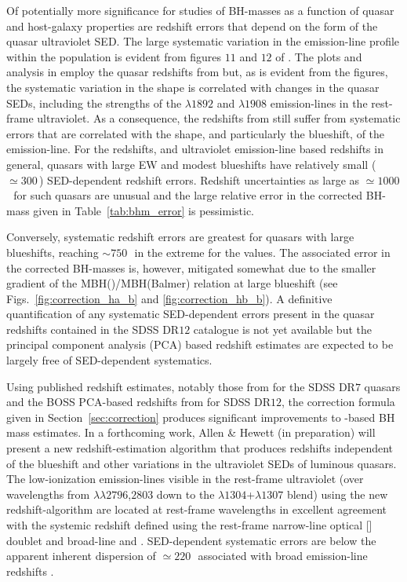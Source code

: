 Of potentially more significance for studies of BH-masses as a function of quasar and host-galaxy properties are redshift errors that depend on the form of the quasar ultraviolet SED.
The large systematic variation in the  emission-line profile within the population is evident from figures $11$ and $12$ of \citet{richards11}. 
The plots and analysis in \citet{richards11} employ the quasar redshifts from \citet{hewett10} but, as is evident from the figures, the systematic variation in the  shape is correlated with changes in the quasar SEDs, including the strengths of the $\lambda$$1892$ and $\lambda$$1908$ emission-lines in the rest-frame ultraviolet. 
As a consequence, the redshifts from \citet{hewett10} still suffer from systematic errors that are correlated with the shape, and particularly the blueshift, of the  emission-line.
For the \citet{hewett10} redshifts, and ultraviolet emission-line based redshifts in general, quasars with large  EW and modest blueshifts have relatively small ($\simeq300$\,\kms) SED-dependent redshift errors.
Redshift uncertainties as large as $\simeq1000$\,\kms\, for such quasars are unusual and the large relative error in the corrected  BH-mass given in Table~\ref{tab:bhm_error} is pessimistic. 

Conversely, systematic redshift errors are greatest for quasars with large blueshifts, reaching $\sim750$\,\kms\, in the extreme for the \citet{hewett10} values. 
The associated error in the corrected  BH-masses is, however, mitigated somewhat due to the smaller gradient of the MBH()/MBH(Balmer) relation at large  blueshift (see Figs.~\ref{fig:correction_ha_b} and \ref{fig:correction_hb_b}). 
A definitive quantification of any systematic SED-dependent errors present in the quasar redshifts contained in the SDSS DR$12$ catalogue is not yet available but the principal component analysis (PCA) based redshift estimates are expected to be largely free of SED-dependent systematics. 

Using published redshift estimates, notably those from \citet{hewett10} for the SDSS DR$7$ quasars and the BOSS PCA-based redshifts from \citet{paris17} for SDSS DR$12$, the correction formula given in Section~\ref{sec:correction} produces significant improvements to -based BH mass estimates.
In a forthcoming work, Allen \& Hewett (in preparation) will present a new redshift-estimation algorithm that produces redshifts independent of the  blueshift and other variations in the ultraviolet SEDs of luminous quasars.
The low-ionization emission-lines visible in the rest-frame ultraviolet (over wavelengths from $\lambda\lambda$$2796$,$2803$ down to the $\lambda$$1304$+$\lambda$$1307$ blend) using the new redshift-algorithm are located at rest-frame wavelengths in excellent agreement with the systemic redshift defined using the rest-frame narrow-line optical [] doublet and broad-line \hb and \hans.
SED-dependent systematic errors are below the apparent inherent dispersion of $\simeq220$\,\kms\, associated with broad emission-line redshifts \citep{shen16b}.

